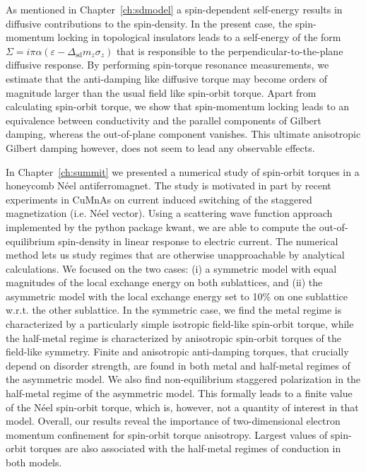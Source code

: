 As mentioned in Chapter~\ref{ch:sdmodel} a spin-dependent self-energy results in diffusive contributions to the spin-density. In the present case, the spin-momentum locking in topological insulators leads to a self-energy of the form $\Sigma = i\pi\alpha(\varepsilon-\Delta_\text{sd} m_z \sigma_z)$ that is responsible to the perpendicular-to-the-plane diffusive response. By performing spin-torque resonance measurements, we estimate that the anti-damping like diffusive torque may become orders of magnitude larger than the usual field like spin-orbit torque. Apart from calculating spin-orbit torque, we show that spin-momentum locking leads to an equivalence between conductivity and the parallel components of Gilbert damping, whereas the out-of-plane component vanishes. This ultimate anisotropic Gilbert damping however, does not seem to lead any observable effects. 

In Chapter~\ref{ch:summit} we presented a numerical study of spin-orbit torques in a honeycomb N\'eel antiferromagnet. The study is motivated in part by recent experiments in CuMnAs on current induced switching of the staggered magnetization (i.e. N\'eel vector). Using a scattering wave function approach implemented by the python package kwant, we are able to compute the out-of-equilibrium spin-density in linear response to electric current. The numerical method lets us study regimes that are otherwise unapproachable by analytical calculations. We focused on the two cases: (i) a symmetric model with equal magnitudes of the local exchange energy on both sublattices, and (ii) the asymmetric model with the local exchange energy set to 10\% on one sublattice w.r.t. the other sublattice. In the symmetric case, we find the metal regime is characterized by a particularly simple isotropic field-like spin-orbit torque, while the half-metal regime is characterized by anisotropic spin-orbit torques of the field-like symmetry.  Finite and anisotropic anti-damping torques, that crucially depend on disorder strength, are found in both metal and half-metal regimes of the asymmetric model. We also find non-equilibrium staggered polarization in the half-metal regime of the asymmetric model. This formally leads to a finite value of the N\'eel spin-orbit torque, which is, however, not a quantity of interest in that model. Overall, our results reveal the importance of two-dimensional electron momentum confinement for spin-orbit torque anisotropy. Largest values of spin-orbit torques are also associated with the half-metal regimes of conduction in both models. 

